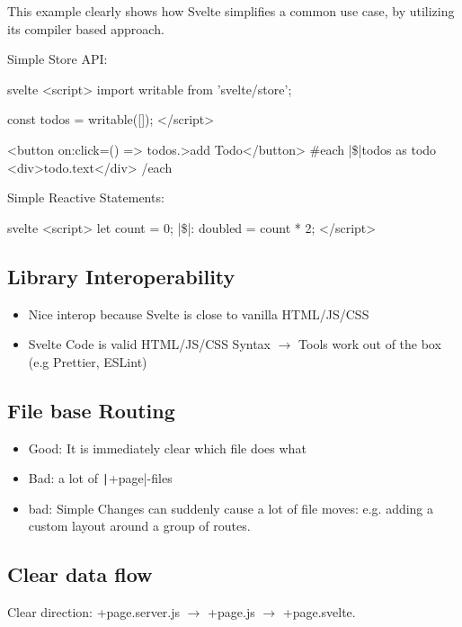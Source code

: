 This example clearly shows how Svelte simplifies a common use case, by utilizing its compiler based approach.

Simple Store API:
\begin{myminted}[escapeinside=||]{svelte}{}
<script>
    import { writable } from 'svelte/store';

    const todos = writable([]);
</script>

<button on:click={() => todos.}>add Todo</button>
{#each |\$|todos as todo}
    <div>{todo.text}</div>
{/each}
\end{myminted}

Simple Reactive Statements:
\begin{myminted}[escapeinside=||]{svelte}{}
<script>
    let count = 0;
    |\$|: doubled = count * 2;
</script>
\end{myminted}

\subsection{Library Interoperability}

\begin{itemize}
    \item Nice interop because Svelte is close to vanilla HTML/JS/CSS
    \item Svelte Code is valid HTML/JS/CSS Syntax $\rightarrow$ Tools work out of the box (e.g Prettier, ESLint)
\end{itemize}

\subsection{File base Routing}

\begin{itemize}
    \item Good: It is immediately clear which file does what
    \item Bad: a lot of \texttt|+page|-files
    \item bad: Simple Changes can suddenly cause a lot of file moves: e.g. adding a custom layout around a group of routes.
\end{itemize}

\subsection{Clear data flow}

Clear direction: +page.server.js $\rightarrow$ +page.js $\rightarrow$ +page.svelte.


